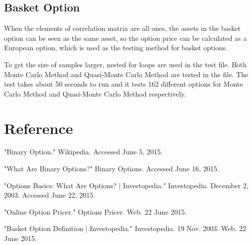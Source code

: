\documentclass[]{elsarticle}
\theoremstyle{definition}
\theoremstyle{remark}
\begin{document}
\subsection{Basket Option}

When the elements of correlation matrix are all ones, the assets in the basket option can be seen as the same asset, so the option price can be calculated as a European option, which is used as the testing method for basket options.

To get the size of samples larger, nested for loops are used in the test file. Both Monte Carlo Method and Quasi-Monte Carlo Method are tested in the file. The test takes about 50 seconds to run and it tests 162 different options for Monte Carlo Method and Quasi-Monte Carlo Method respectively.

\break
\section*{Reference}
"Binary Option." Wikipedia. Accessed June 5, 2015.

"What Are Binary Options?" Binary Options. Accessed June 16, 2015.

"Options Basics: What Are Options? | Investopedia." Investopedia. December 2, 2003. Accessed June 22, 2015.

"Online Option Pricer." Options Pricer. Web. 22 June 2015.

"Basket Option Definition | Investopedia." Investopedia. 19 Nov. 2003. Web. 22 June 2015.
\end{document}
